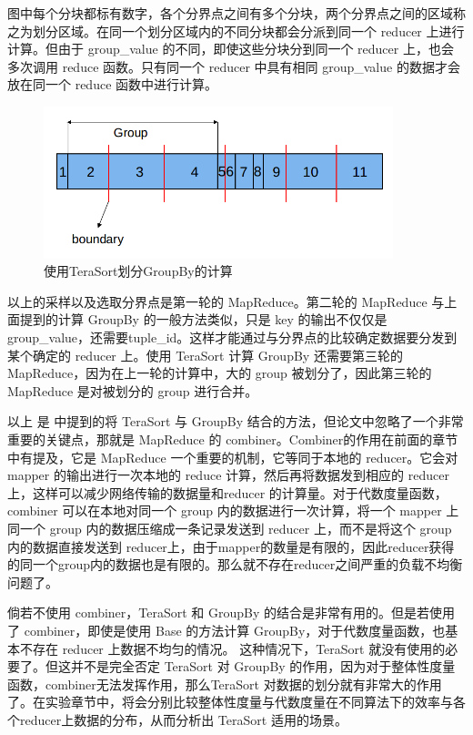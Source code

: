 图中每个分块都标有数字，各个分界点之间有多个分块，两个分界点之间的区域称之为划分区域。在同一个划分区域内的不同分块都会分派到同一个 reducer 上进行计算。但由于 group\_value 的不同，即使这些分块分到同一个 reducer 上，也会多次调用 reduce 函数。只有同一个 reducer 中具有相同 group\_value 的数据才会放在同一个 reduce 函数中进行计算。

\begin{figure}[!ht] 
\centering\includegraphics[width=4in]{picture/ch_terasort_mr/ts_groupby} 
\caption{使用TeraSort划分GroupBy的计算}\label{ts_groupby} 
\end{figure}

以上的采样以及选取分界点是第一轮的 MapReduce。第二轮的 MapReduce 与上面提到的计算 GroupBy 的一般方法类似，只是 key 的输出不仅仅是 group\_value，还需要tuple\_id。这样才能通过与分界点的比较确定数据要分发到某个确定的 reducer 上。使用 TeraSort 计算 GroupBy 还需要第三轮的 MapReduce，因为在上一轮的计算中，大的 group 被划分了，因此第三轮的 MapReduce 是对被划分的 group 进行合并。

以上 是 \cite{tao2013minimal} 中提到的将 TeraSort 与 GroupBy 结合的方法，但论文中忽略了一个非常重要的关键点，那就是 MapReduce 的 combiner。Combiner的作用在前面的章节中有提及，它是 MapReduce 一个重要的机制，它等同于本地的 reducer。它会对 mapper 的输出进行一次本地的 reduce 计算，然后再将数据发到相应的 reducer 上，这样可以减少网络传输的数据量和reducer 的计算量。对于代数度量函数，combiner 可以在本地对同一个 group 内的数据进行一次计算，将一个 mapper 上同一个 group 内的数据压缩成一条记录发送到 reducer 上，而不是将这个 group 内的数据直接发送到 reducer上，由于mapper的数量是有限的，因此reducer获得的同一个group内的数据也是有限的。那么就不存在reducer之间严重的负载不均衡问题了。

倘若不使用 combiner，TeraSort 和 GroupBy 的结合是非常有用的。但是若使用了 combiner，即使是使用 Base 的方法计算 GroupBy，对于代数度量函数，也基本不存在 reducer 上数据不均匀的情况。 这种情况下，TeraSort 就没有使用的必要了。但这并不是完全否定 TeraSort 对 GroupBy 的作用，因为对于整体性度量函数，combiner无法发挥作用，那么TeraSort 对数据的划分就有非常大的作用了。在实验章节中，将会分别比较整体性度量与代数度量在不同算法下的效率与各个reducer上数据的分布，从而分析出 TeraSort 适用的场景。


